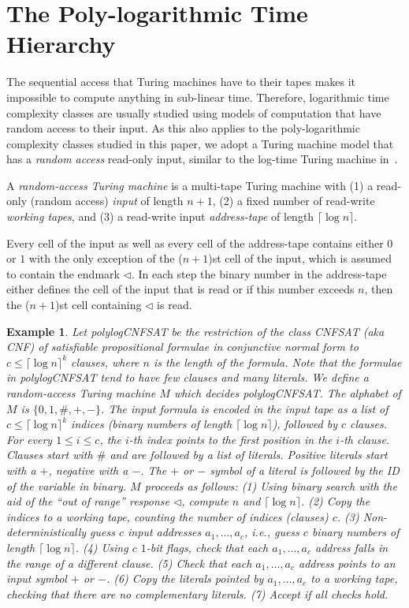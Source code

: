 \documentclass{article}
\newtheorem{example}{Example}
\begin{document}
\section{The Poly-logarithmic Time Hierarchy}\label{sec:plh}

The sequential access that Turing machines have to their tapes makes it impossible to compute anything in sub-linear time. Therefore, logarithmic time complexity classes are usually studied using models of computation that have random access to their input. As this also applies to the poly-logarithmic complexity classes studied in this paper, we adopt a Turing machine model that has a \emph{random access} read-only input, similar to the log-time Turing machine in~\cite{barrington:jcss1990}.

A \emph{random-access Turing machine} is a multi-tape Turing machine with (1) a read-only (random access) \emph{input} of length $n+1$, (2) a fixed number of read-write \emph{working tapes}, and (3) a read-write input \emph{address-tape} of length $\lceil \log n \rceil$.

Every cell of the input as well as every cell of the address-tape contains either $0$ or $1$ with the only exception of the ($n+1$)st cell of the input, which is assumed to contain the endmark $\triangleleft$. In each step the binary number in the address-tape either defines the cell of the input that is read or if this number exceeds $n$, then the ($n+1$)st cell containing $\triangleleft$ is read.   

\begin{example}\label{ex:machine}
Let polylogCNFSAT be the restriction of the class CNFSAT (aka CNF) of satisfiable propositional formulae in conjunctive normal form to $c \leq \lceil \log n \rceil^k$ clauses, where $n$ is the length of the formula. Note that the formulae in polylogCNFSAT tend to have few clauses and many literals. We define a random-access Turing machine $M$ which decides polylogCNFSAT. The alphabet of $M$ is $\{0,1,\#,+,-\}$. The input formula is encoded in the input tape as a list of $c \leq \lceil \log n \rceil^k$ indices (binary numbers of length $\lceil \log n \rceil$), followed by $c$ clauses. For every $1 \leq i \leq c$, the $i$-th index points to the first position in the $i$-th clause. Clauses start with $\#$ and are followed by a list of literals. Positive literals start with a $+$, negative with a $-$. The $+$ or $-$ symbol of a literal is followed by the ID of the variable in binary. $M$ proceeds as follows: (1) Using binary search with the aid of the ``out of range'' response $\triangleleft$, compute $n$ and $\lceil \log n \rceil$. (2) Copy the indices to a working tape, counting the number of indices (clauses) $c$. (3) Non-deterministically guess $c$ input addresses $a_1, \ldots, a_c$, i.e., guess $c$ binary numbers of length $\lceil \log n \rceil$. (4) Using $c$ $1$-bit flags, check that each $a_1, \ldots, a_c$ address falls in the range of a different clause. (5) Check that each $a_1, \ldots, a_c$ address points to an input symbol $+$ or $-$. (6) Copy the literals pointed by $a_1, \ldots, a_c$ to a working tape, checking that there are \emph{no} complementary literals. (7) Accept if all checks hold.
\end{example}
\end{document}
